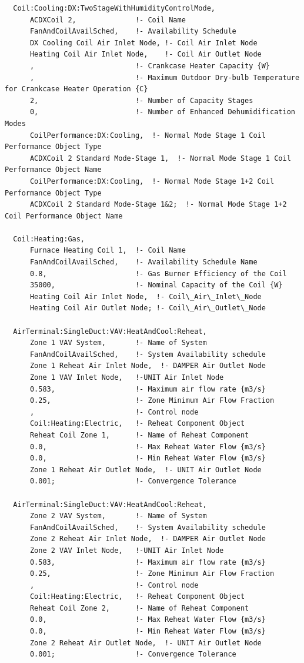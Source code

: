 \begin{lstlisting}
  Coil:Cooling:DX:TwoStageWithHumidityControlMode,
      ACDXCoil 2,              !- Coil Name
      FanAndCoilAvailSched,    !- Availability Schedule
      DX Cooling Coil Air Inlet Node, !- Coil Air Inlet Node
      Heating Coil Air Inlet Node,    !- Coil Air Outlet Node
      ,                        !- Crankcase Heater Capacity {W}
      ,                        !- Maximum Outdoor Dry-bulb Temperature for Crankcase Heater Operation {C}
      2,                       !- Number of Capacity Stages
      0,                       !- Number of Enhanced Dehumidification Modes
      CoilPerformance:DX:Cooling,  !- Normal Mode Stage 1 Coil Performance Object Type
      ACDXCoil 2 Standard Mode-Stage 1,  !- Normal Mode Stage 1 Coil Performance Object Name
      CoilPerformance:DX:Cooling,  !- Normal Mode Stage 1+2 Coil Performance Object Type
      ACDXCoil 2 Standard Mode-Stage 1&2;  !- Normal Mode Stage 1+2 Coil Performance Object Name

  Coil:Heating:Gas,
      Furnace Heating Coil 1,  !- Coil Name
      FanAndCoilAvailSched,    !- Availability Schedule Name
      0.8,                     !- Gas Burner Efficiency of the Coil
      35000,                   !- Nominal Capacity of the Coil {W}
      Heating Coil Air Inlet Node,  !- Coil\_Air\_Inlet\_Node
      Heating Coil Air Outlet Node; !- Coil\_Air\_Outlet\_Node

  AirTerminal:SingleDuct:VAV:HeatAndCool:Reheat,
      Zone 1 VAV System,       !- Name of System
      FanAndCoilAvailSched,    !- System Availability schedule
      Zone 1 Reheat Air Inlet Node,  !- DAMPER Air Outlet Node
      Zone 1 VAV Inlet Node,   !-UNIT Air Inlet Node
      0.583,                   !- Maximum air flow rate {m3/s}
      0.25,                    !- Zone Minimum Air Flow Fraction
      ,                        !- Control node
      Coil:Heating:Electric,   !- Reheat Component Object
      Reheat Coil Zone 1,      !- Name of Reheat Component
      0.0,                     !- Max Reheat Water Flow {m3/s}
      0.0,                     !- Min Reheat Water Flow {m3/s}
      Zone 1 Reheat Air Outlet Node,  !- UNIT Air Outlet Node
      0.001;                   !- Convergence Tolerance

  AirTerminal:SingleDuct:VAV:HeatAndCool:Reheat,
      Zone 2 VAV System,       !- Name of System
      FanAndCoilAvailSched,    !- System Availability schedule
      Zone 2 Reheat Air Inlet Node,  !- DAMPER Air Outlet Node
      Zone 2 VAV Inlet Node,   !-UNIT Air Inlet Node
      0.583,                   !- Maximum air flow rate {m3/s}
      0.25,                    !- Zone Minimum Air Flow Fraction
      ,                        !- Control node
      Coil:Heating:Electric,   !- Reheat Component Object
      Reheat Coil Zone 2,      !- Name of Reheat Component
      0.0,                     !- Max Reheat Water Flow {m3/s}
      0.0,                     !- Min Reheat Water Flow {m3/s}
      Zone 2 Reheat Air Outlet Node,  !- UNIT Air Outlet Node
      0.001;                   !- Convergence Tolerance


\end{lstlisting}
